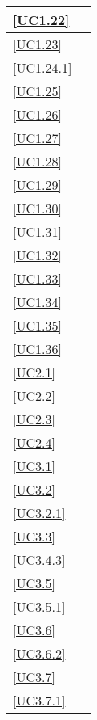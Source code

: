 \begin{longtable}{|P{6cm}|P{6cm}|}
	\hline \ref{UC1.22} &  \\
	\hline \ref{UC1.23} &  \\
	\hline \ref{UC1.24.1} &  \\
	\hline \ref{UC1.25} &  \\
	\hline \ref{UC1.26} &  \\
	\hline \ref{UC1.27} &  \\
	\hline \ref{UC1.28} &  \\
	\hline \ref{UC1.29} &  \\
	\hline \ref{UC1.30} &  \\
	\hline \ref{UC1.31} &  \\
	\hline \ref{UC1.32} &  \\
	\hline \ref{UC1.33} &  \\
	\hline \ref{UC1.34} &  \\
	\hline \ref{UC1.35} &  \\
	\hline \ref{UC1.36} &  \\	
	\hline \ref{UC2.1} &  \\
	\hline \ref{UC2.2} &  \\
	\hline \ref{UC2.3} &  \\
	\hline \ref{UC2.4} &  \\	
	\hline \ref{UC3.1} &  \\
	\hline \ref{UC3.2} &  \\
	\hline \ref{UC3.2.1} &  \\
	\hline \ref{UC3.3} &  \\
	\hline \ref{UC3.4.3} &  \\
	\hline \ref{UC3.5} &  \\
	\hline \ref{UC3.5.1} &  \\
	\hline \ref{UC3.6} &  \\
	\hline \ref{UC3.6.2} &  \\
	\hline \ref{UC3.7} &  \\
	\hline \ref{UC3.7.1} &  \\

\end{longtable}
